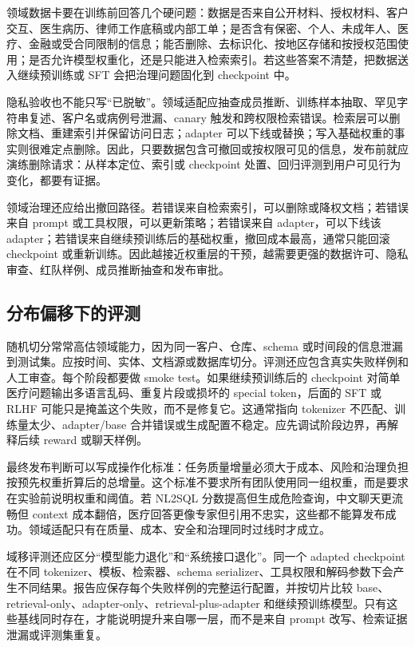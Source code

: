 \documentclass[UTF8,zihao=-4,openany]{ctexbook}
\begin{document}
领域数据卡要在训练前回答几个硬问题：数据是否来自公开材料、授权材料、客户交互、医生病历、律师工作底稿或内部工单；是否含有保密、个人、未成年人、医疗、金融或受合同限制的信息；能否删除、去标识化、按地区存储和按授权范围使用；是否允许模型权重化，还是只能进入检索索引。若这些答案不清楚，把数据送入继续预训练或 SFT 会把治理问题固化到 checkpoint 中。

隐私验收也不能只写“已脱敏”。领域适配应抽查成员推断、训练样本抽取、罕见字符串复述、客户名或病例号泄漏、canary 触发和跨权限检索错误。检索层可以删除文档、重建索引并保留访问日志；adapter 可以下线或替换；写入基础权重的事实则很难定点删除。因此，只要数据包含可撤回或按权限可见的信息，发布前就应演练删除请求：从样本定位、索引或 checkpoint 处置、回归评测到用户可见行为变化，都要有证据。

领域治理还应给出撤回路径。若错误来自检索索引，可以删除或降权文档；若错误来自 prompt 或工具权限，可以更新策略；若错误来自 adapter，可以下线该 adapter；若错误来自继续预训练后的基础权重，撤回成本最高，通常只能回滚 checkpoint 或重新训练。因此越接近权重层的干预，越需要更强的数据许可、隐私审查、红队样例、成员推断抽查和发布审批。

\subsection{分布偏移下的评测}
随机切分常常高估领域能力，因为同一客户、仓库、schema 或时间段的信息泄漏到测试集。应按时间、实体、文档源或数据库切分。评测还应包含真实失败样例和人工审查。每个阶段都要做 smoke test。如果继续预训练后的 checkpoint 对简单医疗问题输出多语言乱码、重复片段或损坏的 special token，后面的 SFT 或 RLHF 可能只是掩盖这个失败，而不是修复它。这通常指向 tokenizer 不匹配、训练量太少、adapter/base 合并错误或生成配置不稳定。应先调试阶段边界，再解释后续 reward 或聊天样例。

最终发布判断可以写成操作化标准：任务质量增量必须大于成本、风险和治理负担按预先权重折算后的总增量。这个标准不要求所有团队使用同一组权重，而是要求在实验前说明权重和阈值。若 NL2SQL 分数提高但生成危险查询，中文聊天更流畅但 context 成本翻倍，医疗回答更像专家但引用不忠实，这些都不能算发布成功。领域适配只有在质量、成本、安全和治理同时过线时才成立。

域移评测还应区分“模型能力退化”和“系统接口退化”。同一个 adapted checkpoint 在不同 tokenizer、模板、检索器、schema serializer、工具权限和解码参数下会产生不同结果。报告应保存每个失败样例的完整运行配置，并按切片比较 base、retrieval-only、adapter-only、retrieval-plus-adapter 和继续预训练模型。只有这些基线同时存在，才能说明提升来自哪一层，而不是来自 prompt 改写、检索证据泄漏或评测集重复。
\end{document}
